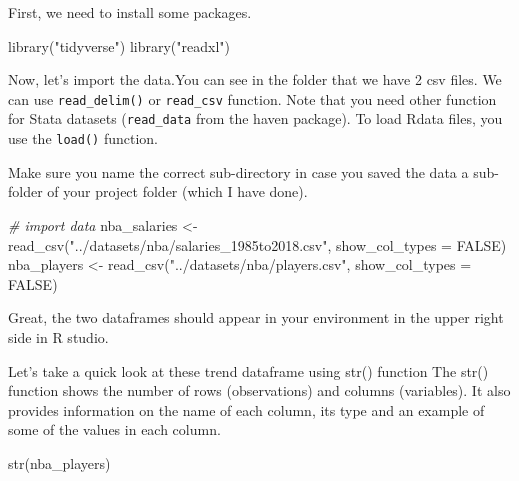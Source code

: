 \documentclass[
]{book}
\newenvironment{Shaded}{\begin{snugshade}}{\end{snugshade}}
\newcommand{\AttributeTok}[1]{\textcolor[rgb]{0.77,0.63,0.00}{#1}}
\newcommand{\AttributeTok}[1]{\textcolor[rgb]{0.13,0.29,0.53}{#1}}
\newcommand{\CommentTok}[1]{\textcolor[rgb]{0.56,0.35,0.01}{\textit{#1}}}
\newcommand{\ConstantTok}[1]{\textcolor[rgb]{0.00,0.00,0.00}{#1}}
\newcommand{\ConstantTok}[1]{\textcolor[rgb]{0.56,0.35,0.01}{#1}}
\newcommand{\FunctionTok}[1]{\textcolor[rgb]{0.00,0.00,0.00}{#1}}
\newcommand{\FunctionTok}[1]{\textcolor[rgb]{0.13,0.29,0.53}{\textbf{#1}}}
\newcommand{\NormalTok}[1]{#1}
\newcommand{\OtherTok}[1]{\textcolor[rgb]{0.56,0.35,0.01}{#1}}
\newcommand{\StringTok}[1]{\textcolor[rgb]{0.31,0.60,0.02}{#1}}
\begin{document}
First, we need to install some packages.

\begin{Shaded}
\begin{Highlighting}[]
\FunctionTok{library}\NormalTok{(}\StringTok{"tidyverse"}\NormalTok{)}
\FunctionTok{library}\NormalTok{(}\StringTok{"readxl"}\NormalTok{)}
\end{Highlighting}
\end{Shaded}

Now, let's import the data.You can see in the folder that we have 2 csv files.
We can use \texttt{read\_delim()} or \texttt{read\_csv} function. Note that you need other function for Stata datasets (\texttt{read\_data} from the haven package). To load Rdata files, you use the \texttt{load()} function.

Make sure you name the correct sub-directory in case you saved the data a sub-folder of your project folder (which I have done).

\begin{Shaded}
\begin{Highlighting}[]
\CommentTok{\# import data }
\NormalTok{nba\_salaries }\OtherTok{\textless{}{-}} \FunctionTok{read\_csv}\NormalTok{(}\StringTok{"../datasets/nba/salaries\_1985to2018.csv"}\NormalTok{, }\AttributeTok{show\_col\_types =} \ConstantTok{FALSE}\NormalTok{)}
\NormalTok{nba\_players }\OtherTok{\textless{}{-}} \FunctionTok{read\_csv}\NormalTok{(}\StringTok{"../datasets/nba/players.csv"}\NormalTok{, }\AttributeTok{show\_col\_types =} \ConstantTok{FALSE}\NormalTok{)}
\end{Highlighting}
\end{Shaded}

Great, the two dataframes should appear in your environment in the upper right side in R studio.

Let's take a quick look at these trend dataframe using str() function The str() function shows the number of rows (observations) and columns (variables). It also provides information on the name of each column, its type and an example of some of the values in each column.

\begin{Shaded}
\begin{Highlighting}[]
\FunctionTok{str}\NormalTok{(nba\_players)}
\end{Highlighting}
\end{Shaded}
\end{document}
